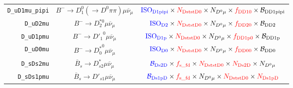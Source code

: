 \begin{landscape}
\begin{table}
\begin{tabular}{r|c|c}
  \texttt{D\_uD1mu\_pipi} &       $B^- \rightarrow D_1^0 (\rightarrow D^0 \pi\pi) \mu \overline{\nu}_\mu$        &                                                                                           $\textcolor{blue}{\text{ISO}_\text{D1pipi}} \times \textcolor{red}{N_\text{DststD0}} \times N_{D^0 \mu} \times \textcolor{red}{f_\text{DD10}} \times \mathcal{B}_\text{DD1pipi}$                                                                                            \\
        \texttt{D\_uD2mu} &                  $B^- \rightarrow D_2^{*0} \mu \overline{\nu}_\mu$                   &                                                                                               $\textcolor{blue}{\text{ISO}_\text{D2}} \times \textcolor{red}{N_\text{DststD0}} \times N_{D^0 \mu} \times \textcolor{red}{f_\text{DD20}} \times \mathcal{B}_\text{DD2}$                                                                                                \\
       \texttt{D\_uD1pmu} &                  $B^- \rightarrow {D'_1}^0 \mu \overline{\nu}_\mu$                   &                                                                                              $\textcolor{blue}{\text{ISO}_\text{D1p}} \times \textcolor{red}{N_\text{DststD0}} \times N_{D^0 \mu} \times \textcolor{red}{f_\text{DD1p0}} \times \mathcal{B}_\text{DD1p}$                                                                                              \\
        \texttt{D\_uD0mu} &                  $B^- \rightarrow {D^*_0}^0 \mu \overline{\nu}_\mu$                  &                                                                                               $\textcolor{blue}{\text{ISO}_\text{D0}} \times \textcolor{red}{N_\text{DststD0}} \times N_{D^0 \mu} \times \textcolor{red}{f_\text{DD00}} \times \mathcal{B}_\text{DD0}$                                                                                                \\
       \texttt{D\_sDs2mu} &             $\overline{B}_s \rightarrow D_{s2}^* \mu \overline{\nu}_\mu$             &                                                                                         $\textcolor{blue}{\mathcal{B}_\text{Ds2D}} \times \textcolor{red}{f_\text{s\_fd}} \times \textcolor{red}{N_\text{DststD0}} \times \textcolor{red}{N_\text{Ds2D}} \times N_{D^0 \mu}$                                                                                          \\
      \texttt{D\_sDs1pmu} &             $\overline{B}_s \rightarrow D'_{s1} \mu \overline{\nu}_\mu$              &                                                                                        $\textcolor{blue}{\mathcal{B}_\text{Ds1pD}} \times \textcolor{red}{f_\text{s\_fd}} \times N_{D^0 \mu} \times \textcolor{red}{N_\text{DststD0}} \times \textcolor{red}{N_\text{Ds1pD}}$                                                                                         \\

\end{tabular}
\end{table}
\end{landscape}
